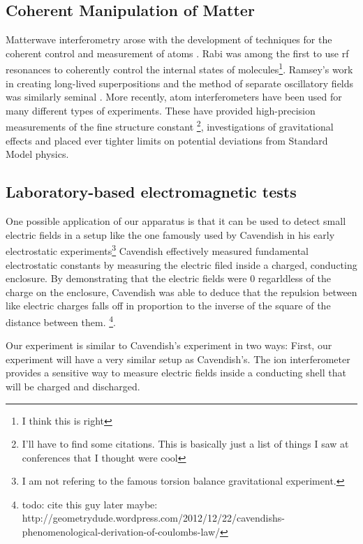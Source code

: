 \subsection{Coherent Manipulation of Matter}
Matterwave interferometry arose with the development of techniques for the coherent control and measurement of atoms \cite{Kronin_RMP}. Rabi was among the first to use rf resonances to coherently control the internal states of molecules\footnote{I think this is right}. Ramsey's work in creating long-lived superpositions and the method of separate oscillatory fields was similarly seminal \cite{Kronin_RMP}. 
More recently, atom interferometers have been used for many different types of experiments. These have provided high-precision measurements of the fine structure constant \footnote{I'll have to find some citations. This is basically just a list of things I saw at conferences that I thought were cool}, investigations of gravitational effects and placed ever tighter limits on potential deviations from Standard Model physics. 

\subsection{Laboratory-based electromagnetic tests}
One possible application of our apparatus is that it can be used to detect small electric fields in a setup like the one famously used by Cavendish in his early electrostatic experiments\footnote{I am not refering to the famous torsion balance gravitational experiment.} Cavendish effectively measured fundamental electrostatic constants by measuring the electric filed inside a charged, conducting enclosure. By demonstrating that the electric fields were 0 regarldless of the charge on the enclosure, Cavendish was able to deduce that the repulsion between like electric charges falls off in proportion to the inverse of the square of the distance between them. \footnote{todo: cite this guy later maybe:  http://geometrydude.wordpress.com/2012/12/22/cavendishs-phenomenological-derivation-of-coulombs-law/}. 


Our experiment is similar to Cavendish's experiment in two ways: First, our experiment will have a very similar setup as Cavendish's. The ion interferometer provides a sensitive way to measure electric fields inside a conducting shell that will be charged and discharged.  


